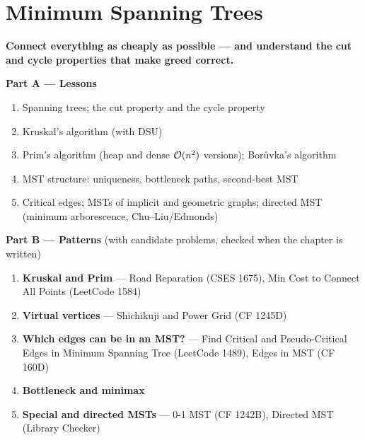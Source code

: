 \chapter{Minimum Spanning Trees}
\label{ch:mst}

\begin{tcolorbox}[enhanced, colback=white, colframe=secondaryblue, boxrule=1pt, arc=2mm]
\textbf{\large\textcolor{primaryblue}{Connect everything as cheaply as possible --- and understand the cut and cycle properties that make greed correct.}}
\end{tcolorbox}


\begin{plannedbox}
\textbf{Part A --- Lessons}
\begin{enumerate}[leftmargin=*, label=\textbf{A\arabic*.}, itemsep=1pt]
    \item Spanning trees; the cut property and the cycle property
    \item Kruskal's algorithm (with DSU)
    \item Prim's algorithm (heap and dense $\mathcal{O}(n^2)$ versions); Bor\r{u}vka's algorithm
    \item MST structure: uniqueness, bottleneck paths, second-best MST
    \item Critical edges; MSTs of implicit and geometric graphs; directed MST (minimum arborescence, Chu--Liu/Edmonds)
\end{enumerate}
\textbf{Part B --- Patterns} (with candidate problems, checked when the chapter is written)
\begin{enumerate}[leftmargin=*, label=\textbf{P\arabic*.}, itemsep=1pt]
    \item \textbf{Kruskal and Prim} --- Road Reparation {\small\color{darkgray}(CSES 1675)}, Min Cost to Connect All Points {\small\color{darkgray}(LeetCode 1584)}
    \item \textbf{Virtual vertices} --- Shichikuji and Power Grid {\small\color{darkgray}(CF 1245D)}
    \item \textbf{Which edges can be in an MST?} --- Find Critical and Pseudo-Critical Edges in Minimum Spanning Tree {\small\color{darkgray}(LeetCode 1489)}, Edges in MST {\small\color{darkgray}(CF 160D)}
    \item \textbf{Bottleneck and minimax}
    \item \textbf{Special and directed MSTs} --- 0-1 MST {\small\color{darkgray}(CF 1242B)}, Directed MST {\small\color{darkgray}(Library Checker)}
\end{enumerate}
\end{plannedbox}
